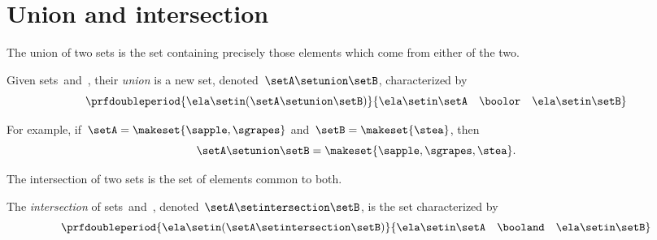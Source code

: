 
\section{Union and intersection}



The union of two sets is the set containing precisely those elements which come from either of the two.
\begin{ctdefinition}[Union]
    \label{def:union-of-sets}
    Given sets~\setA and~\setB, their \emph{union} is a new set, denoted~$\setA \setunion \setB$, characterized by
    \begin{equation}
        \prfdoubleperiod{
            \ela \setin(\setA \setunion \setB)
        }{
            \ela \setin\setA \quad \boolor \quad \ela \setin\setB
        }
    \end{equation}
\end{ctdefinition}

For example, if~$\setA = \makeset{ \sapple, \sgrapes }$ and~$\setB = \makeset{ \stea }$, then
\begin{equation}
    \setA \setunion \setB = \makeset{ \sapple, \sgrapes, \stea }.
\end{equation}


The intersection of two sets is the set of elements common to both.

\begin{ctdefinition}[Intersection]
    \label{def:intersection-of-sets}
    The \emph{intersection} of sets~\setA and~\setB, denoted~$\setA \setintersection \setB$, is the set characterized by
    \begin{equation}
        \prfdoubleperiod{
            \ela \setin(\setA \setintersection \setB)
        }{
            \ela \setin\setA \quad \booland \quad \ela \setin\setB
        }
    \end{equation}
\end{ctdefinition}

